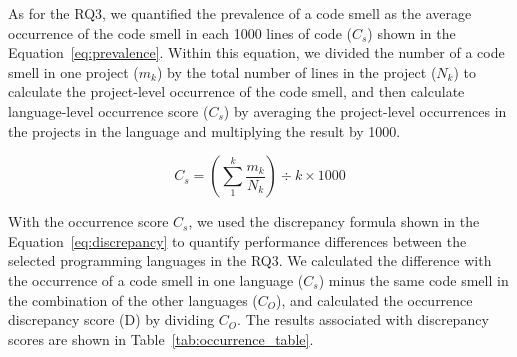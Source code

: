 
As for the RQ3, we quantified the prevalence of a code smell as the average
occurrence of the code smell in each 1000 lines of code ($C_{s}$) shown in the
Equation~\ref{eq:prevalence}. Within this equation, we divided the number of a
code smell in one project ($m_{k}$) by the total number of lines in the project
($N_{k}$) to calculate the project-level occurrence of the code smell, and then
calculate language-level occurrence score ($C_{s}$) by averaging the
project-level occurrences in the projects in the language and multiplying the
result by 1000.

\vspace{-0.5em}

\begin{equation}
C_{s} = \left( \sum_{1}^{k}{\frac{m_{k}}{N_{k}}} \right) \div k \times 1000
\label{eq:prevalence}
\end{equation}


With the occurrence score $C_{s}$, we used the discrepancy formula shown in
the Equation~\ref{eq:discrepancy} to quantify performance differences between
the selected programming languages in the RQ3. We calculated the difference with
the occurrence of a code smell in one language ($C_{s}$) minus the same code
smell in the combination of the other languages ($C_{O}$), and calculated the
occurrence discrepancy score (D) by dividing $C_{O}$. The results associated
with discrepancy scores are shown in Table~\ref{tab:occurrence_table}.

